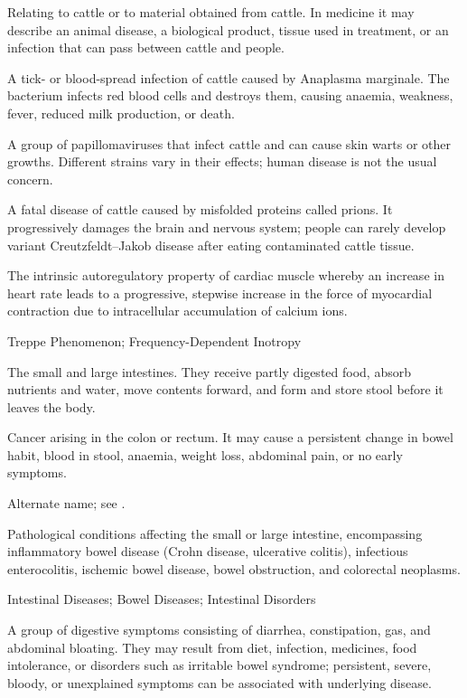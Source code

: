 Relating to cattle or to material obtained from cattle. In medicine it may describe an animal disease, a biological product, tissue used in treatment, or an infection that can pass between cattle and people.

 A tick- or blood-spread infection of cattle caused by Anaplasma marginale. The bacterium infects red blood cells and destroys them, causing anaemia, weakness, fever, reduced milk production, or death.

 A group of papillomaviruses that infect cattle and can cause skin warts or other growths. Different strains vary in their effects; human disease is not the usual concern.

 A fatal disease of cattle caused by misfolded proteins called prions. It progressively damages the brain and nervous system; people can rarely develop variant Creutzfeldt--Jakob disease after eating contaminated cattle tissue.

 The intrinsic autoregulatory property of cardiac muscle whereby an increase in heart rate leads to a progressive, stepwise increase in the force of myocardial contraction due to intracellular accumulation of calcium ions.

\synonyms
Treppe Phenomenon; Frequency-Dependent Inotropy

 The small and large intestines. They receive partly digested food, absorb nutrients and water, move contents forward, and form and store stool before it leaves the body.

 Cancer arising in the colon or rectum. It may cause a persistent change in bowel habit, blood in stool, anaemia, weight loss, abdominal pain, or no early symptoms.

 Alternate name; see .

 Pathological conditions affecting the small or large intestine, encompassing inflammatory bowel disease (Crohn disease, ulcerative colitis), infectious enterocolitis, ischemic bowel disease, bowel obstruction, and colorectal neoplasms.

\synonyms
Intestinal Diseases; Bowel Diseases; Intestinal Disorders

 A group of digestive symptoms consisting of diarrhea, constipation, gas, and abdominal bloating. They may result from diet, infection, medicines, food intolerance, or disorders such as irritable bowel syndrome; persistent, severe, bloody, or unexplained symptoms can be associated with underlying disease.


